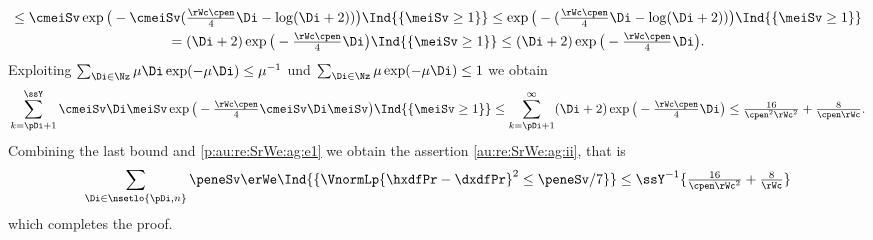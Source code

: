 \begin{pro}
\begin{multline}
    \\\hfill\leq
    \cmeiSv\exp\big(-\cmeiSv(\tfrac{\rWc\cpen}{4}\Di-\log(\Di+2))\big)\Ind{\{\meiSv\geq1\}}
    \leq\exp\big(-(\tfrac{\rWc\cpen}{4}\Di-\log(\Di+2))\big)\Ind{\{\meiSv\geq1\}}\\
    =(\Di+2)\exp\big(-\tfrac{\rWc\cpen}{4}\Di\big)\Ind{\{\meiSv\geq1\}}\leq (\Di+2)\exp\big(-\tfrac{\rWc\cpen}{4}\Di\big).
  \end{multline}
  Exploiting $\sum_{\Di\in\Nz}\mu\Di\exp(-\mu\Di)\leq \mu^{-1}$ und
  $\sum_{\Di\in\Nz}\mu\exp(-\mu\Di)\leq 1$ we obtain
  \begin{displaymath}
    \sum_{k=\pDi+1}^{\ssY}\cmeiSv\Di \meiSv\exp\big(-\tfrac{\rWc\cpen}{4}\cmeiSv\Di\meiSv\big)\Ind{\{\meiSv\geq1\}}
    \leq \sum_{k=\pDi+1}^\infty(\Di+2)\exp\big(-\tfrac{\rWc\cpen}{4}\Di\big)
    \leq \tfrac{16}{\cpen^2\rWc^{2}}+ \tfrac{8}{\cpen\rWc}.
  \end{displaymath}
  Combining the last bound and \eqref{p:au:re:SrWe:ag:e1} we obtain the
  assertion \ref{au:re:SrWe:ag:ii}, that is
  \begin{displaymath}
    \sum_{\Di\in\nsetlo{\pDi,n}}\peneSv\erWe\Ind{\{\VnormLp{\hxdfPr-\dxdfPr}^2\leq\peneSv/7\}}
    \leq \ssY^{-1}\{\tfrac{16}{\cpen\rWc^{2}}+ \tfrac{8}{\rWc}\}
  \end{displaymath}
  which completes the proof.\proEnd
\end{pro}
